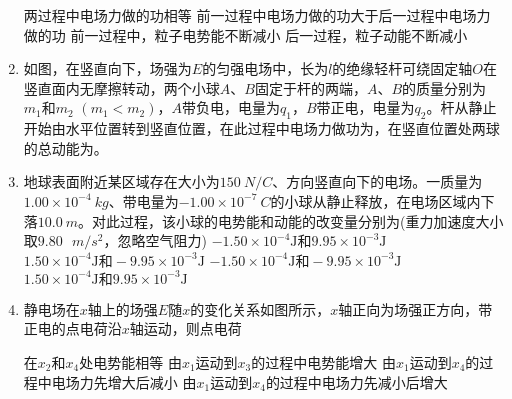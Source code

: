 \begin{enumerate}[leftmargin=0em]
\fourchoices
{两过程中电场力做的功相等}
{前一过程中电场力做的功大于后一过程中电场力做的功}
{前一过程中，粒子电势能不断减小}
{后一过程，粒子动能不断减小}





\item
{}
如图，在竖直向下，场强为$ E $的匀强电场中，长为$ l $的绝缘轻杆可绕固定轴$ O $在竖直面内无摩擦转动，两个小球$ A $、$ B $固定于杆的两端，$ A $、$ B $的质量分别为$ m_{1} $和$ m_{2} $ $ (m_{1}<m_{2}) $，$ A $带负电，电量为$ q_{1} $，$ B $带正电，电量为$ q_{2} $。杆从静止开始由水平位置转到竖直位置，在此过程中电场力做功为，在竖直位置处两球的总动能为。
\begin{figure}[h!]
\centering

\end{figure}


\item
{}
地球表面附近某区域存在大小为$ 150 \ N/C $、方向竖直向下的电场。一质量为$ 1.00 \times 10 ^{-4} \ kg $、带电量为$ - 1.00 \times 10^{-7}\ C $的小球从静止释放，在电场区域内下落$ 10.0\ m $。对此过程，该小球的电势能和动能的改变量分别为(重力加速度大小取$ 9.80 \ \ \ m/s ^{2} $，忽略空气阻力)  
\fourchoices
{$- 1.50 \times 10 ^ { - 4 } \mathrm { J } \text{和} 9.95 \times 10 ^ { - 3 } \mathrm { J }$}
{$1.50 \times 10 ^ { - 4 } \mathrm { J } \text{和} -9.95 \times 10 ^ { - 3 } \mathrm { J }$}
{$ - 1.50 \times 10 ^ { - 4 } \mathrm { J } \text{和} -9.95 \times 10 ^ { - 3 } \mathrm { J }$}
{$ 1.50 \times 10 ^ { - 4 } \mathrm { J } \text{和} 9.95 \times 10 ^ { - 3 } \mathrm { J }$}





\item
{}
静电场在$ x $轴上的场强$ E $随$ x $的变化关系如图所示，$ x $轴正向为场强正方向，带正电的点电荷沿$ x $轴运动，则点电荷  
\begin{figure}[h!]
\centering

\end{figure}

\fourchoices
{在$ x_{2} $和$ x_4 $处电势能相等}
{由$ x_{1} $运动到$ x_3 $的过程中电势能增大}
{由$ x_{1} $运动到$ x_4 $的过程中电场力先增大后减小}
{由$ x_{1} $运动到$ x_4 $的过程中电场力先减小后增大}




\end{enumerate}
